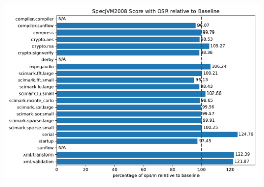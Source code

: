 \documentclass[draft,final]{vutinfth} %
\begin{document}
    \includegraphics[width=\textwidth]{../evaluation/specjvm/plots/plot_normalized}


    \backmatter


    \begin{kitools}
    \end{kitools}




    \printindex


    
%    
    
\end{document}
